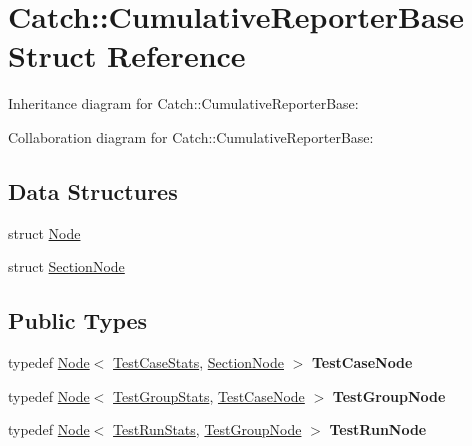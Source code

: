 \hypertarget{structCatch_1_1CumulativeReporterBase}{}\section{Catch\+:\+:Cumulative\+Reporter\+Base Struct Reference}
\label{structCatch_1_1CumulativeReporterBase}


Inheritance diagram for Catch\+:\+:Cumulative\+Reporter\+Base\+:


Collaboration diagram for Catch\+:\+:Cumulative\+Reporter\+Base\+:
\subsection*{Data Structures}
\begin{DoxyCompactItemize}
\item 
struct \hyperlink{structCatch_1_1CumulativeReporterBase_1_1Node}{Node}
\item 
struct \hyperlink{structCatch_1_1CumulativeReporterBase_1_1SectionNode}{Section\+Node}
\end{DoxyCompactItemize}
\subsection*{Public Types}
\begin{DoxyCompactItemize}
\item 
typedef \hyperlink{structCatch_1_1CumulativeReporterBase_1_1Node}{Node}$<$ \hyperlink{structCatch_1_1TestCaseStats}{Test\+Case\+Stats}, \hyperlink{structCatch_1_1CumulativeReporterBase_1_1SectionNode}{Section\+Node} $>$ {\bfseries Test\+Case\+Node}\hypertarget{structCatch_1_1CumulativeReporterBase_a46853912952f5286abbebfeba2266055}{}\label{structCatch_1_1CumulativeReporterBase_a46853912952f5286abbebfeba2266055}

\item 
typedef \hyperlink{structCatch_1_1CumulativeReporterBase_1_1Node}{Node}$<$ \hyperlink{structCatch_1_1TestGroupStats}{Test\+Group\+Stats}, \hyperlink{structCatch_1_1CumulativeReporterBase_1_1Node}{Test\+Case\+Node} $>$ {\bfseries Test\+Group\+Node}\hypertarget{structCatch_1_1CumulativeReporterBase_a4c3fa5afc75155641d11f3aa01b97898}{}\label{structCatch_1_1CumulativeReporterBase_a4c3fa5afc75155641d11f3aa01b97898}

\item 
typedef \hyperlink{structCatch_1_1CumulativeReporterBase_1_1Node}{Node}$<$ \hyperlink{structCatch_1_1TestRunStats}{Test\+Run\+Stats}, \hyperlink{structCatch_1_1CumulativeReporterBase_1_1Node}{Test\+Group\+Node} $>$ {\bfseries Test\+Run\+Node}\hypertarget{structCatch_1_1CumulativeReporterBase_ac3f51b6d1942f4aa46afbb174f7265e6}{}\label{structCatch_1_1CumulativeReporterBase_ac3f51b6d1942f4aa46afbb174f7265e6}

\end{DoxyCompactItemize}
